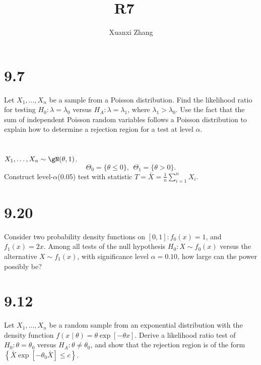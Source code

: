 \documentclass{article}%
\title{\huge R7 \ \normalsize}
\author{Xuanxi Zhang}
\newif\ifwithrefs
\begin{document}
\maketitle



\section{9.7}
Let $X_1, \ldots, X_n$ be a sample from a Poisson distribution. Find the likelihood ratio for testing $H_0: \lambda=\lambda_0$ versus $H_A: \lambda=\lambda_1$, where $\lambda_1>\lambda_0$. Use the fact that the sum of independent Poisson random variables follows a Poisson distribution to explain how to determine a rejection region for a test at level $\alpha$.


\section{}
$X_1, \ldots, X_n\sim \gN(\theta,1)$.
$$
\Theta_0=\{\theta\leq 0\}, \ \ \Theta_1=\{\theta>0\}.
$$
Construct level-$\alpha$(0.05) test with statistic $T=\bar{X}=\frac{1}{n}\sum_{i=1}^n X_i$.


\section{9.20}
Consider two probability density functions on $[0,1]: f_0(x)=1$, and $f_1(x)=2 x$. Among all tests of the null hypothesis $H_0: X \sim f_0(x)$ versus the alternative $X \sim f_1(x)$, with significance level $\alpha=0.10$, how large can the power possibly be?


\section{9.12}
Let $X_1, \ldots, X_n$ be a random sample from an exponential distribution with the density function $f(x \mid \theta)=\theta \exp [-\theta x]$. Derive a likelihood ratio test of $H_0: \theta= \theta_0$ versus $H_A: \theta \neq \theta_0$, and show that the rejection region is of the form $\left\{\bar{X} \exp \left[-\theta_0 \bar{X}\right] \leq c\right\}$.








\ifwithrefs
  
\fi
\end{document}
